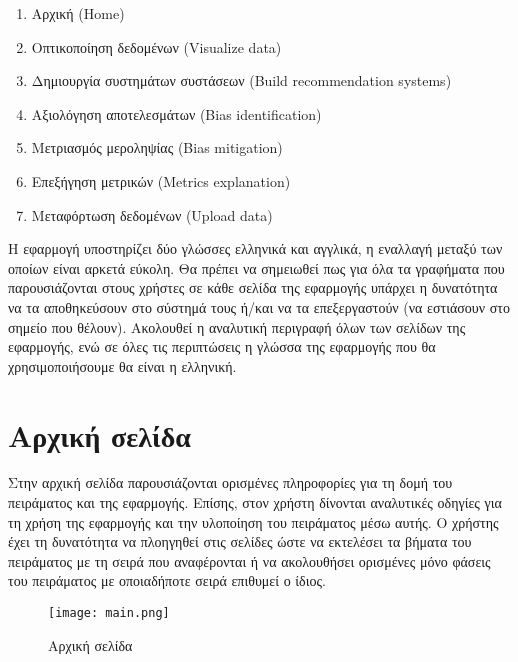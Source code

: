 \begin{enumerate}
	\item Αρχική (Home) 
	\item Οπτικοποίηση δεδομένων (Visualize data)
	\item Δημιουργία συστημάτων συστάσεων (Build recommendation systems)
	\item Αξιολόγηση αποτελεσμάτων (Bias identification)
	\item Μετριασμός μεροληψίας (Bias mitigation)
	\item Επεξήγηση μετρικών (Metrics explanation)
	\item Μεταφόρτωση δεδομένων (Upload data)
\end{enumerate}
Η εφαρμογή υποστηρίζει δύο γλώσσες ελληνικά και αγγλικά, η εναλλαγή μεταξύ των οποίων είναι αρκετά εύκολη. Θα πρέπει να σημειωθεί πως για όλα τα γραφήματα που παρουσιάζονται στους χρήστες σε κάθε σελίδα της εφαρμογής υπάρχει η δυνατότητα να τα αποθηκεύσουν στο σύστημά τους ή/και να τα επεξεργαστούν (να εστιάσουν στο σημείο που θέλουν). Ακολουθεί η αναλυτική περιγραφή όλων των σελίδων της εφαρμογής, ενώ σε όλες τις περιπτώσεις η γλώσσα της εφαρμογής που θα χρησιμοποιήσουμε θα είναι η ελληνική.
\section{Αρχική σελίδα}
\noindent Στην αρχική σελίδα παρουσιάζονται ορισμένες πληροφορίες για τη δομή του πειράματος και της εφαρμογής. Επίσης, στον χρήστη δίνονται αναλυτικές οδηγίες για τη χρήση της εφαρμογής και την υλοποίηση του πειράματος μέσω αυτής.
Ο χρήστης έχει τη δυνατότητα να πλοηγηθεί στις σελίδες ώστε να εκτελέσει τα βήματα του πειράματος με τη σειρά που αναφέρονται ή να ακολουθήσει ορισμένες μόνο φάσεις του πειράματος με οποιαδήποτε σειρά επιθυμεί ο ίδιος.
\begin{figure}[!htb]
	\centering
	\texttt{[image: main.png]}
	\caption{Αρχική σελίδα}
	\label{fig:main}
\end{figure}
